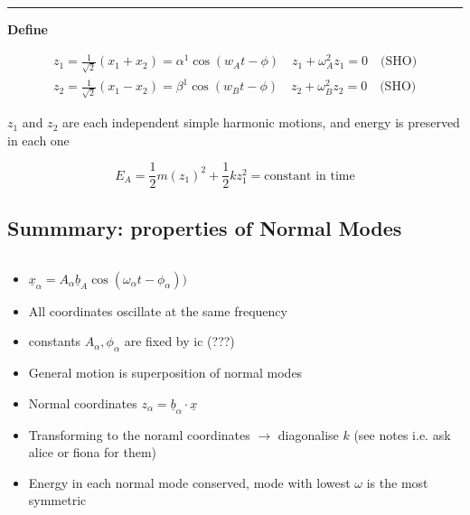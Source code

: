 \documentclass{article}
\begin{document}
\noindent\rule{\textwidth}{0.2pt}

\textbf{Define}

\begin{align*}
    z_{1} = \frac{1}{\sqrt{2}}(x_{1} + x_{2}) = \alpha^{1}\cos(w_{A}t - \phi) \quad z_{1}+\omega^{2}_{A} z_{1} = 0 \quad\text{(SHO)} \\
    z_{2} = \frac{1}{\sqrt{2}}(x_{1} - x_{2}) = \beta^{1}\cos(w_{B}t - \phi) \quad z_{2}+\omega^{2}_{B} z_{2} = 0\quad\text{(SHO)}
\end{align*}

$z_{1}$ and $z_{2}$ are each independent simple harmonic motions, and energy is preserved in each one

\[E_{A} = \frac{1}{2} m (z_{1})^{2} + \frac{1}{2} k z^{2}_{1} = \text{constant in time}\]

\subsection{Summmary: properties of Normal Modes}
\[\]
\begin{itemize}
    \item $\underline{x}_{\alpha} = A_{\alpha} \underline{b}_{A} \cos(\omega_{\alpha} t - \phi_{\alpha}))$
    \item All coordinates oscillate at the same frequency
    \item constants $A_{\alpha}, \phi_{\alpha}$ are fixed by  ic (???)
    \item General motion is superposition of normal modes
    \item Normal coordinates $z_{\alpha} = \underline{b}_{\alpha} \cdot \underline{x}$
    \item Transforming to the noraml coordinates $\to$ diagonalise $k$ (see notes i.e. ask alice or fiona for them)
    \item Energy in each normal mode conserved, mode with lowest $\omega$ is the most symmetric
\end{itemize}
\end{document}

